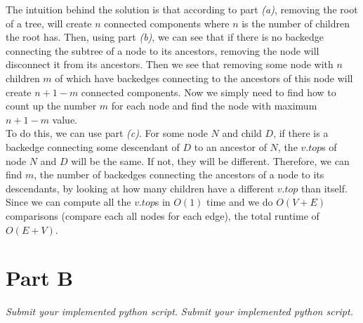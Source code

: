 \documentclass[12pt,twoside]{article}
\begin{document}
\begin{problems}
\begin{problemparts}
\problempart %
The intuition behind the solution is that according to part \emph{(a)}, removing the root of a tree, will create $n$ connected components where $n$ is the number of children the root has. Then, using part \emph{(b)}, we can see that if there is no backedge connecting the subtree of a node to its ancestors, removing the node will disconnect it from its ancestors. Then we see that removing some node with $n$ children $m$ of which have backedges connecting to the ancestors of this node will create $n+1-m$ connected components. Now we simply need to find how to count up the number $m$ for each node and find the node with maximum $n+1-m$ value.\\
To do this, we can use part \emph{(c)}. For some node $N$ and child $D$, if there is a backedge connecting some descendant of $D$ to an ancestor of $N$, the $v.top$s of node $N$ and $D$ will be the same. If not, they will be different. Therefore, we can find $m$, the number of backedges connecting the ancestors of a node to its descendants, by looking at how many children have a different $v.top$ than itself. Since we can compute all the $v.top$s in $O(1)$ time and we do $O(V+E)$ comparisons (compare each all nodes for each edge), the total runtime of $O(E+V)$.
\end{problemparts}

\section*{Part B}
\problem  %
\begin{problemparts}
\problempart \emph{Submit your implemented python script.}  %
\problempart \emph{Submit your implemented python script.}  %
\end{problemparts}
\end{problems}
\end{document}
